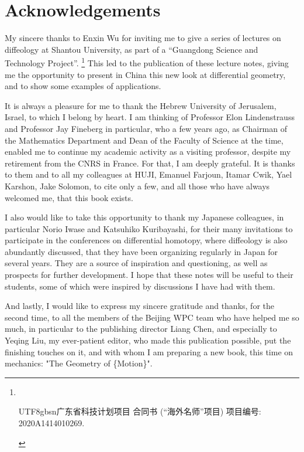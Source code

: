 \newpage\thispagestyle{empty}
\setcounter{footnote}{0}

\chapter*{Acknowledgements}

My sincere thanks to Enxin Wu for inviting me to give a series of lectures on diffeology at Shantou University,
as part of a ``Guangdong Science and Technology Project''.%
\footnote{\ \begin{CJK}{UTF8}{gbsn}广东省科技计划项目 合同书 (“海外名师”项目) 项目编号: 2020A1414010269.\end{CJK}}
This led to the publication of these lecture notes,
giving me the opportunity to present in China this new look at differential geometry,
and to show some examples of applications.

\medskip\noindent
It is always a pleasure for me to thank the Hebrew University of Jerusalem, Israel,
to which I belong by heart.
I am thinking of Professor Elon Lindenstrauss and Professor Jay Fineberg in particular,
who a few years ago,
as Chairman of the Mathematics Department and Dean of the Faculty of Science at the time,
enabled me to continue my academic activity as a visiting professor,
despite my retirement from the CNRS in France.
For that,
I am deeply grateful.
It is thanks to them and to all my colleagues at HUJI,
Emanuel Farjoun,
Itamar Cwik,
Yael Karshon,
Jake Solomon,
to cite only a few,
and all those who have always welcomed me,
that this book exists.

\medskip\noindent
I also would like to take this opportunity to thank my Japanese colleagues,
in particular Norio Iwase and Katsuhiko Kuribayashi,
for their many invitations to participate in the conferences on differential homotopy,
where diffeology is also abundantly discussed,
that they have been organizing regularly in Japan for several years.
They are a source of inspiration and questioning,
as well as prospects for further development.
I hope that these notes will be useful to their students,
some of which were inspired by discussions I have had with them.

\medskip\noindent
And lastly,
I would like to express my sincere gratitude and thanks,
for the second time,
to all the members of the Beijing WPC team who have helped me so much,
in particular to the publishing director Liang Chen,
and especially to Yeqing Liu,
my ever-patient editor,
who made this publication possible,
put the finishing touches on it,
and with whom I am preparing a new book,
this time on mechanics: "The Geometry of \{Motion\}".

